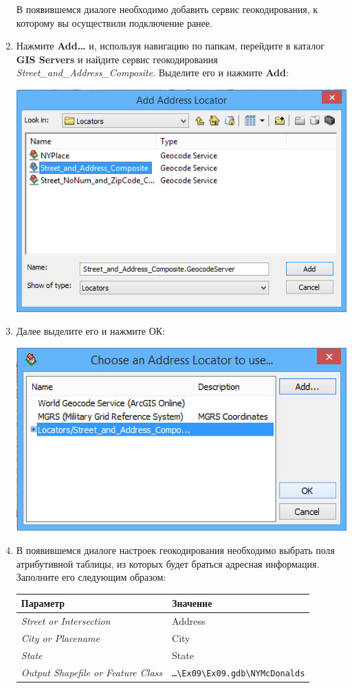 \documentclass[]{book}
\theoremstyle{definition}
\theoremstyle{definition}
\theoremstyle{definition}
\theoremstyle{remark}
\begin{document}
\begin{enumerate}
  В появившемся диалоге необходимо добавить сервис геокодирования, к
  которому вы осуществили подключение ранее.
\item
  Нажмите \textbf{Add\ldots{}} и, используя навигацию по папкам,
  перейдите в каталог \textbf{GIS Servers} и найдите сервис
  геокодирования \emph{Street\_and\_Address\_Composite}. Выделите его и
  нажмите \textbf{Add}:

  \includegraphics{images/Ex09/image11.png}
\item
  Далее выделите его и нажмите ОК:

  \includegraphics{images/Ex09/image12.png}
\item
  В появившемся диалоге настроек геокодирования необходимо выбрать поля
  атрибутивной таблицы, из которых будет браться адресная информация.
  Заполните его следующим образом:

  \begin{longtable}[]{@{}ll@{}}
  \toprule
  Параметр & Значение\tabularnewline
  \midrule
  \endhead
  \emph{Street or Intersection} & Address\tabularnewline
  \emph{City or Placename} & City\tabularnewline
  \emph{State} & State\tabularnewline
  \emph{Output Shapefile or Feature Class} &
  \texttt{\ldots{}\textbackslash{}Ex09\textbackslash{}Ex09.gdb\textbackslash{}NYMcDonalds}\tabularnewline
  \bottomrule
  \end{longtable}


\end{enumerate}
\end{document}
